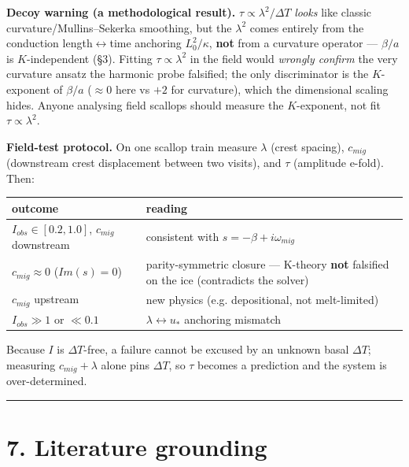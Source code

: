\documentclass[11pt]{article}
\begin{document}
\textbf{Decoy warning (a methodological result).} $\tau  \propto  \lambda ^{2}/\Delta T$ \emph{looks} like classic curvature/Mullins–Sekerka smoothing, but the $\lambda ^{2}$ comes entirely from the conduction length\ensuremath{\leftrightarrow}time anchoring $L_{0}^{2}/\kappa $, \textbf{not} from a curvature operator — $\beta /a$ is $K$-independent (§3). Fitting $\tau \propto \lambda ^{2}$ in the field would \emph{wrongly confirm} the very curvature ansatz the harmonic probe falsified; the only discriminator is the $K$-exponent of $\beta /a$ ($\approx 0$ here vs $+2$ for curvature), which the dimensional scaling hides. Anyone analysing field scallops should measure the $K$-exponent, not fit $\tau \propto \lambda ^{2}$.


\textbf{Field-test protocol.} On one scallop train measure $\lambda $ (crest spacing), $c_{mig}$ (downstream crest displacement between two visits), and $\tau $ (amplitude e-fold). Then:


\begin{center}\small
\begin{tabularx}{\linewidth}{>{\raggedright\arraybackslash}X>{\raggedright\arraybackslash}X}
\toprule
outcome & reading \\
\midrule
$I_{obs} \in  [0.2,1.0]$, $c_{mig}$ downstream & consistent with $s=-\beta +i\omega _{mig}$ \\
$c_{mig} \approx  0$ ($Im(s)=0$) & parity-symmetric closure — K-theory \textbf{not} falsified on the ice (contradicts the solver) \\
$c_{mig}$ upstream & new physics (e.g. depositional, not melt-limited) \\
$I_{obs} \gg  1$ or $\ll  0.1$ & $\lambda  \leftrightarrow  u_*$ anchoring mismatch \\
\bottomrule
\end{tabularx}
\end{center}


Because $I$ is $\Delta T$-free, a failure cannot be excused by an unknown basal $\Delta T$; measuring $c_{mig} + \lambda $ alone pins $\Delta T$, so $\tau $ becomes a prediction and the system is over-determined.


\medskip\hrule\medskip


\section*{7. Literature grounding}
\end{document}

